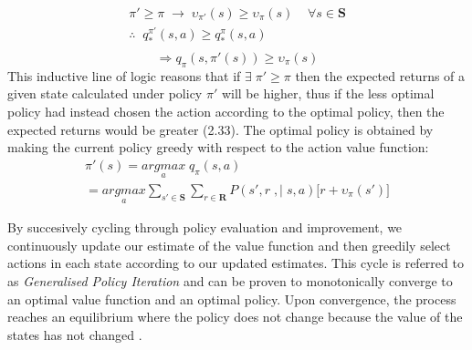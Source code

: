 \begin{enumerate}
\begin{equation}
        \end{equation}
        \begin{equation}
            \begin{gathered}
                \pi' \geq \pi \; \to \; \upsilon_{\pi'}(s) \geq \upsilon_{\pi}(s) \;\;\;\; \forall s \in \mathbf{S} \\
                \therefore \;\;  q_{*}^{\pi'}(s,a) \geq q_{*}^{\pi}(s,a) \\
            \end{gathered}
        \end{equation}
        \begin{equation}
            \Rightarrow q_\pi(s, \pi'(s)) \geq \upsilon_\pi(s)
        \end{equation}
        This inductive line of logic reasons that if $\exists \; \pi' \geq \pi$ then the expected 
        returns of a given state calculated under policy $\pi'$ will be higher, thus if the less
        optimal policy had instead chosen the action according to the optimal policy, then the expected returns would be
        greater (2.33). The optimal policy is obtained by making the current policy greedy with
        respect to the action value function:
        \begin{equation}
            \begin{gathered}
                \pi'(s) = \underset{a}{argmax} \; q_\pi(s,a) \\
                = \underset{a}{argmax} \sum_{s' \in \mathbf{S}}\sum_{r \in \mathbf{R}}P(s',r \;, | \; s,a) \biggl [r + \upsilon_\pi(s') \biggl]
            \end{gathered}
        \end{equation}
\end{enumerate}

By succesively cycling through policy evaluation and improvement, we 
continuously update our estimate of the value function and then greedily select
actions in each state according to our updated estimates. This cycle is referred to
as \emph{Generalised Policy Iteration} and can be proven to monotonically converge to
an optimal value function and an optimal policy. Upon convergence, the process reaches an
equilibrium where the policy does not change because the value of the states has not changed \cite{sutton2018reinforcement}.
